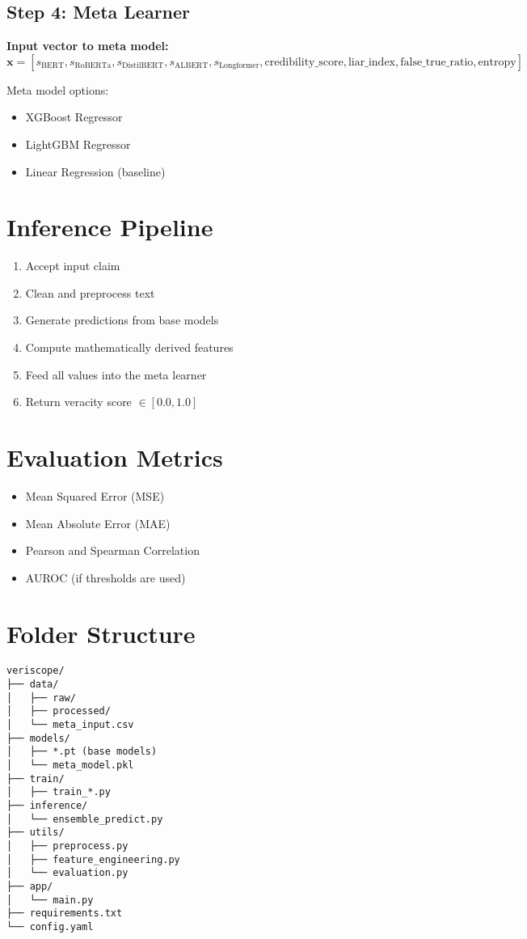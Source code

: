 \documentclass{article}
\begin{document}
\subsection*{Step 4: Meta Learner}

\textbf{Input vector to meta model:}
\[
\mathbf{x} = [s_{\mathrm{BERT}}, s_{\mathrm{RoBERTa}}, s_{\mathrm{DistilBERT}}, s_{\mathrm{ALBERT}}, s_{\mathrm{Longformer}}, \mathrm{credibility\_score}, \mathrm{liar\_index}, \mathrm{false\_true\_ratio}, \mathrm{entropy}]
\]

Meta model options:
\begin{itemize}
  \item XGBoost Regressor
  \item LightGBM Regressor
  \item Linear Regression (baseline)
\end{itemize}

\section*{Inference Pipeline}
\begin{enumerate}
  \item Accept input claim
  \item Clean and preprocess text
  \item Generate predictions from base models
  \item Compute mathematically derived features
  \item Feed all values into the meta learner
  \item Return veracity score $\in [0.0, 1.0]$
\end{enumerate}

\section*{Evaluation Metrics}
\begin{itemize}
  \item Mean Squared Error (MSE)
  \item Mean Absolute Error (MAE)
  \item Pearson and Spearman Correlation
  \item AUROC (if thresholds are used)
\end{itemize}

\section*{Folder Structure}
\begin{verbatim}
veriscope/
├── data/
│   ├── raw/
│   ├── processed/
│   └── meta_input.csv
├── models/
│   ├── *.pt (base models)
│   └── meta_model.pkl
├── train/
│   ├── train_*.py
├── inference/
│   └── ensemble_predict.py
├── utils/
│   ├── preprocess.py
│   ├── feature_engineering.py
│   └── evaluation.py
├── app/
│   └── main.py
├── requirements.txt
└── config.yaml
\end{verbatim}
\end{document}
